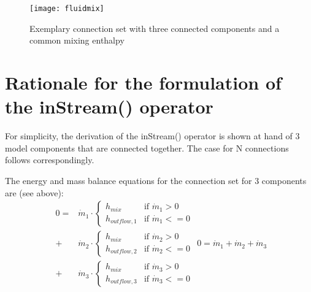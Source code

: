 \begin{figure}[H]
\caption{Exemplary connection set with three connected components and a common mixing enthalpy}
\begin{center}
\texttt{[image: fluidmix]}
\end{center}
\end{figure}

\section{Rationale for the formulation of the inStream() operator}

For simplicity, the derivation of the inStream() operator is shown at
hand of 3 model components that are connected together. The case for N
connections follows correspondingly.

The energy and mass balance equations for the connection set for 3
components are (see above):
\begin{subequations}
\begin{equation}
\begin{split}
0=&\dot{m}_1\cdot
\begin{cases}
h_{mix}&\text{if $\dot{m}_1>0$}\\
h_{outflow,1}&\text{if $\dot{m}_1<=0$}
\end{cases}\\
+&\dot{m}_2\cdot
\begin{cases}
h_{mix}&\text{if $\dot{m}_2>0$}\\
h_{outflow,2}&\text{if $\dot{m}_2<=0$}
\end{cases}\\
+&\dot{m}_3\cdot
\begin{cases}
h_{mix}&\text{if $\dot{m}_3>0$}\\
h_{outflow,3}&\text{if $\dot{m}_3<=0$}
\end{cases}
\end{split}
\label{D1a}
\end{equation}
\begin{equation}
0=\dot{m}_1+\dot{m}_2+\dot{m}_3
\label{D1b}
\end{equation}
\label{D1}
\end{subequations}

